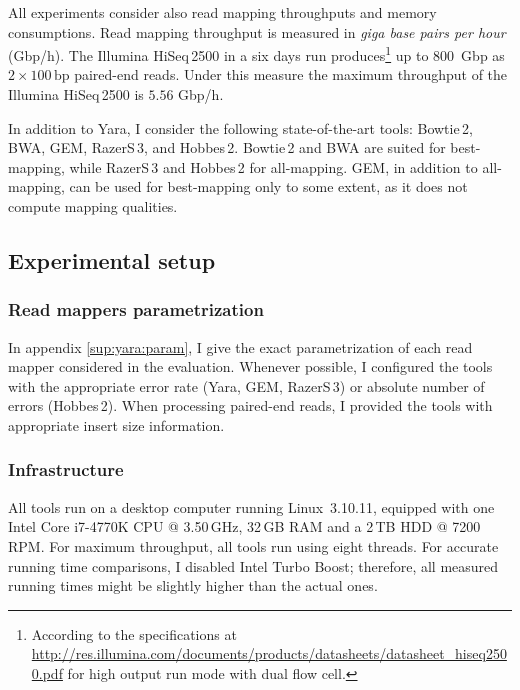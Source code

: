 All experiments consider also read mapping throughputs and memory consumptions.
Read mapping throughput is measured in \emph{giga base pairs per hour} (Gbp/h).
The Illumina HiSeq\,2500 in a six days run produces\footnote{According to the specifications at \url{http://res.illumina.com/documents/products/datasheets/datasheet_hiseq2500.pdf} for high output run mode with dual flow cell.} up to 800~Gbp as $2 \times 100\,\text{bp}$ paired-end reads.
Under this measure the maximum throughput of the Illumina HiSeq\,2500 is $5.56$ Gbp/h.

In addition to Yara, I consider the following state-of-the-art tools: Bowtie\,2, BWA, GEM, RazerS\,3, and Hobbes\,2.
Bowtie\,2 and BWA are suited for best-mapping, while RazerS\,3 and Hobbes\,2 for all-mapping.
GEM, in addition to all-mapping, can be used for best-mapping only to some extent, as it does not compute mapping qualities.

\subsection{Experimental setup}

\subsubsection{Read mappers parametrization}

In appendix \ref{sup:yara:param}, I give the exact parametrization of each read mapper considered in the evaluation.
Whenever possible, I configured the tools with the appropriate error rate (Yara, GEM, RazerS\,3) or absolute number of errors (Hobbes\,2).
When processing paired-end reads, I provided the tools with appropriate insert size information.

\subsubsection{Infrastructure}

All tools run on a desktop computer running Linux~3.10.11, equipped with one Intel\textsuperscript{\textregistered} Core i7-4770K CPU @ 3.50\,GHz, 32\,GB RAM and a 2\,TB HDD @ 7200\,RPM.
For maximum throughput, all tools run using eight threads.
For accurate running time comparisons, I disabled Intel Turbo Boost; therefore, all measured running times might be slightly higher than the actual ones.

